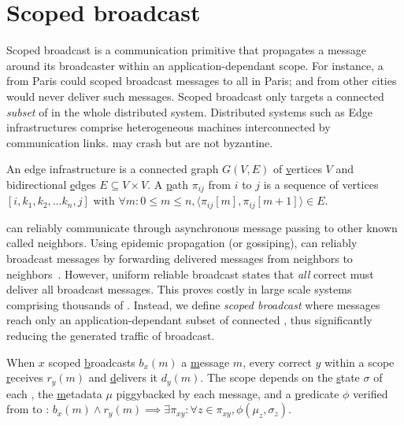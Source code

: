 

\vfill {}
\newpage

\section{Scoped broadcast}
\label{sec:scoped}

Scoped broadcast is a communication primitive that propagates a
message around its broadcaster within an application-dependant scope.
For instance, a \process from Paris could scoped broadcast messages to
all \processes in Paris; and \processes from other cities would never
deliver such messages.
Scoped broadcast only targets a connected \emph{subset} of \processes
in the whole distributed system.
%
Distributed systems such as Edge infrastructures comprise
heterogeneous machines interconnected by communication
links. \Processes may crash but are not byzantine.


\begin{definition}
  An edge infrastructure is a connected \underline{g}raph $G(V, E)$ of
  \underline{v}ertices $V$ and bidirectional \underline{e}dges $E
  \subseteq V \times V$.  A \underline{p}ath $\pi_{ij}$ from \Process
  $i$ to \Process $j$ is a sequence of vertices $[i, k_1, k_2, \ldots
    k_n, j]$ with $\forall m: 0\leq m \leq n, \langle \pi_{ij}[m],
  \pi_{ij}[m+1] \rangle \in E$.
\end{definition}

\Processes can reliably communicate through asynchronous message
passing to other known \processes called neighbors. Using epidemic
propagation (or gossiping), \processes can reliably broadcast messages
by forwarding delivered messages from neighbors to
neighbors~\cite{birman1999bimodal, hadzilacos1994modular,
  nedelec2018causal, raynal2013distributed}. However, uniform reliable
broadcast states that \emph{all} correct \processes must deliver all
broadcast messages. This proves costly in large scale systems
comprising thousands of \processes. Instead, we define \emph{scoped
broadcast} where messages reach only an application-dependant subset
of connected \processes, thus significantly reducing the generated
traffic of broadcast.

\begin{definition}
  When \Process $x$ scoped \underline{b}roadcasts $b_x(m)$ a
  \underline{m}essage $m$, every correct \process $y$ within a scope
  \underline{r}eceives $r_y(m)$ and \underline{d}elivers it
  $d_y(m)$. The scope depends on the \underline{s}tate $\sigma$ of
  each \process, the \underline{m}etadata $\mu$ piggybacked by each
  message, and a \underline{p}redicate $\phi$ verified from \process to
  \process: {\small{$b_x(m) \wedge r_y(m) \implies \exists \pi_{xy}: \forall z
  \in \pi_{xy}, \phi(\mu_z, \sigma_z)$}}.
\end{definition}

